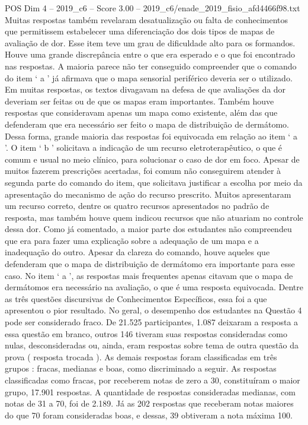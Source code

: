 \begin{textsample}{POS Dim 4 – 2019\_c6 – Score 3.00 – 2019\_c6/enade\_2019\_fisio\_afd4466f98.txt}
Muitas respostas também revelaram desatualização ou falta de conhecimentos que permitissem estabelecer uma diferenciação dos dois tipos de mapas de avaliação de dor.
Esse item teve um grau de dificuldade alto para os formandos.
Houve uma grande discrepância entre o que era esperado e o que foi encontrado nas respostas.
A maioria parece não ter conseguido compreender que o comando do item ‘ a ’ já afirmava que o mapa sensorial periférico deveria ser o utilizado.
Em muitas respostas, os textos divagavam na defesa de que avaliações da dor deveriam ser feitas ou de que os mapas eram importantes.
Também houve respostas que consideravam apenas um mapa como existente, além das que defenderam que era necessário ser feito o mapa de distribuição de dermátomo.
Dessa forma, grande maioria das respostas foi equivocada em relação ao item ‘ a ’.
O item ‘ b ’ solicitava a indicação de um recurso eletroterapêutico, o que é comum e usual no meio clínico, para solucionar o caso de dor em foco.
Apesar de muitos fazerem prescrições acertadas, foi comum não conseguirem atender à segunda parte do comando do item, que solicitava justificar a escolha por meio da apresentação do mecanismo de ação do recurso prescrito.
Muitos apresentaram um recurso correto, dentre os quatro recursos apresentados no padrão de resposta, mas também houve quem indicou recursos que não atuariam no controle dessa dor.
Como já comentado, a maior parte dos estudantes não compreendeu que era para fazer uma explicação sobre a adequação de um mapa e a inadequação do outro.
Apesar da clareza do comando, houve aqueles que defenderam que o mapa de distribuição de dermátomo era importante para esse caso.
No item ‘ a ’, as respostas mais frequentes apenas citavam que o mapa de dermátomos era necessário na avaliação, o que é uma resposta equivocada.
Dentre as três questões discursivas de Conhecimentos Específicos, essa foi a que apresentou o pior resultado.
No geral, o desempenho dos estudantes na Questão 4 pode ser considerado fraco.
De 21.525 participantes, 1.087 deixaram a resposta a essa questão em branco, outros 146 tiveram suas respostas consideradas como nulas, desconsideradas ou, ainda, eram respostas sobre tema de outra questão da prova ( resposta trocada ).
As demais respostas foram classificadas em três grupos : fracas, medianas e boas, como discriminado a seguir.
As respostas classificadas como fracas, por receberem notas de zero a 30, constituíram o maior grupo, 17.901 respostas.
A quantidade de respostas consideradas medianas, com notas de 31 a 70, foi de 2.189.
Já as 202 respostas que receberam notas maiores do que 70 foram consideradas boas, e dessas, 39 obtiveram a nota máxima 100.

\end{textsample}
